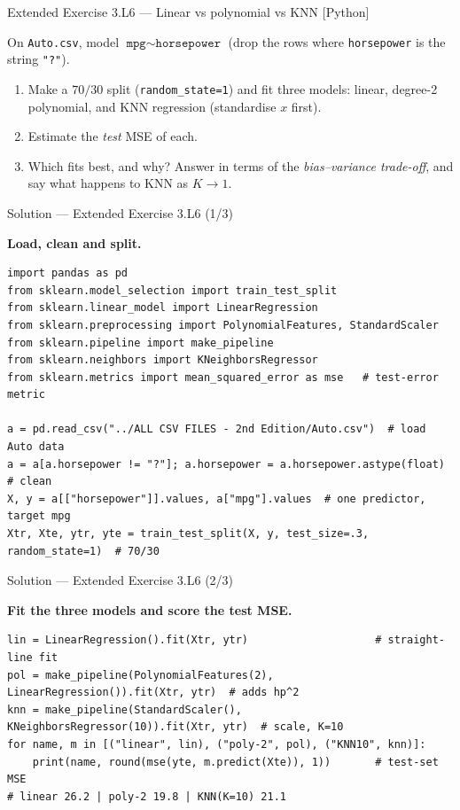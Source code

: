 \documentclass[aspectratio=169,11pt]{beamer}
\begin{document}
\begin{frame}[fragile]{Extended Exercise 3.L6 --- Linear vs polynomial vs KNN [Python]}
  \begin{longexercise}
    On \texttt{Auto.csv}, model $\texttt{mpg}\sim\texttt{horsepower}$
    (drop the rows where \texttt{horsepower} is the string \texttt{"?"}).
    \begin{enumerate}
      \item Make a $70/30$ split (\texttt{random\_state=1}) and fit three
            models: linear, degree-2 polynomial, and KNN regression
            (standardise $x$ first).
      \item Estimate the \emph{test} MSE of each.
      \item Which fits best, and why? Answer in terms of the
            \emph{bias--variance trade-off}, and say what happens to KNN as
            $K\to 1$.
    \end{enumerate}
  \end{longexercise}
\end{frame}

\begin{frame}[fragile]{Solution --- Extended Exercise 3.L6 (1/3)}
  \begin{solutionbox}
    \textbf{Load, clean and split.}
\begin{lstlisting}[basicstyle=\ttfamily\scriptsize]
import pandas as pd
from sklearn.model_selection import train_test_split
from sklearn.linear_model import LinearRegression
from sklearn.preprocessing import PolynomialFeatures, StandardScaler
from sklearn.pipeline import make_pipeline
from sklearn.neighbors import KNeighborsRegressor
from sklearn.metrics import mean_squared_error as mse   # test-error metric

a = pd.read_csv("../ALL CSV FILES - 2nd Edition/Auto.csv")  # load Auto data
a = a[a.horsepower != "?"]; a.horsepower = a.horsepower.astype(float)  # clean
X, y = a[["horsepower"]].values, a["mpg"].values  # one predictor, target mpg
Xtr, Xte, ytr, yte = train_test_split(X, y, test_size=.3, random_state=1)  # 70/30
\end{lstlisting}
  \end{solutionbox}
\end{frame}

\begin{frame}[fragile]{Solution --- Extended Exercise 3.L6 (2/3)}
  \begin{solutionbox}
    \textbf{Fit the three models and score the test MSE.}
\begin{lstlisting}[basicstyle=\ttfamily\scriptsize]
lin = LinearRegression().fit(Xtr, ytr)                    # straight-line fit
pol = make_pipeline(PolynomialFeatures(2), LinearRegression()).fit(Xtr, ytr)  # adds hp^2
knn = make_pipeline(StandardScaler(), KNeighborsRegressor(10)).fit(Xtr, ytr)  # scale, K=10
for name, m in [("linear", lin), ("poly-2", pol), ("KNN10", knn)]:
    print(name, round(mse(yte, m.predict(Xte)), 1))       # test-set MSE
# linear 26.2 | poly-2 19.8 | KNN(K=10) 21.1
\end{lstlisting}
  \end{solutionbox}
\end{frame}
\end{document}
